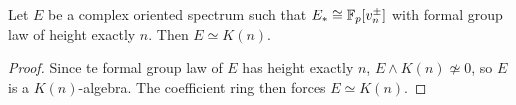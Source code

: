 \begin{corollary}
    Let $E$ be a complex oriented spectrum such that $E_*\cong \mathbb{F}_p[v_n^{\pm}]$ with formal group law of height exactly $n$. Then $E\simeq K(n)$.
\end{corollary}
\begin{proof}
    Since te formal group law of $E$ has height exactly $n$, $E\wedge K(n)\not \simeq 0$, so $E$ is a $K(n)$-algebra. The coefficient ring then forces $E\simeq K(n)$.
\end{proof}

